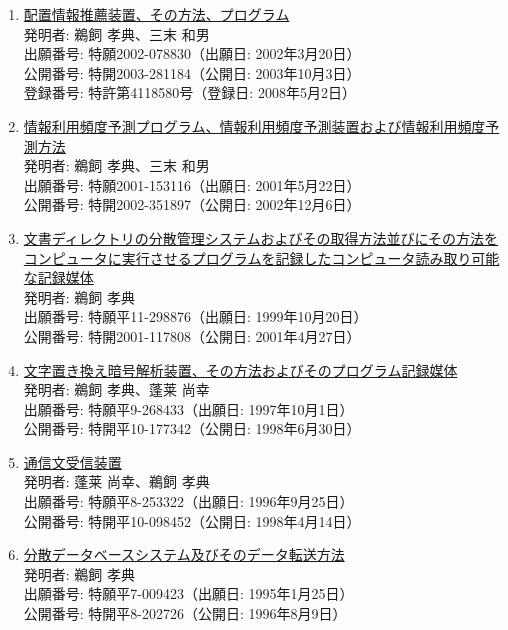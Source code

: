\documentclass[dvipdfmx]{jlreq}
\begin{document}
\begin{enumerate}[label=\arabic*,align=parleft]
\begin{enumerate}
\item \href{https://jglobal.jst.go.jp/detail?JGLOBAL_ID=201103072767260762}{配置情報推薦装置、その方法、プログラム}\\発明者: 鵜飼 孝典、三末 和男\\出願番号: 特願2002-078830（出願日: 2002年3月20日）\\公開番号: 特開2003-281184（公開日: 2003年10月3日）\\登録番号: 特許第4118580号（登録日: 2008年5月2日）
\item \href{https://jglobal.jst.go.jp/detail?JGLOBAL_ID=200903042053791042}{情報利用頻度予測プログラム、情報利用頻度予測装置および情報利用頻度予測方法}\\発明者: 鵜飼 孝典、三末 和男\\出願番号: 特願2001-153116（出願日: 2001年5月22日）\\公開番号: 特開2002-351897（公開日: 2002年12月6日）
\item \href{https://jglobal.jst.go.jp/detail?JGLOBAL_ID=200903020716053101}{文書ディレクトリの分散管理システムおよびその取得方法並びにその方法をコンピュータに実行させるプログラムを記録したコンピュータ読み取り可能な記録媒体}\\発明者: 鵜飼 孝典\\出願番号: 特願平11-298876（出願日: 1999年10月20日）\\公開番号: 特開2001-117808（公開日: 2001年4月27日）
\item \href{https://jglobal.jst.go.jp/detail?JGLOBAL_ID=200903010229519949}{文字置き換え暗号解析装置、その方法およびそのプログラム記録媒体}\\発明者: 鵜飼 孝典、蓬莱 尚幸\\出願番号: 特願平9-268433（出願日: 1997年10月1日）\\公開番号: 特開平10-177342（公開日: 1998年6月30日）
\item \href{https://jglobal.jst.go.jp/detail?JGLOBAL_ID=200903056240744288}{通信文受信装置}\\発明者: 蓬莱 尚幸、鵜飼 孝典\\出願番号: 特願平8-253322（出願日: 1996年9月25日）\\公開番号: 特開平10-098452（公開日: 1998年4月14日）
\item \href{https://jglobal.jst.go.jp/detail?JGLOBAL_ID=200903029171020399}{分散データベースシステム及びそのデータ転送方法}\\発明者: 鵜飼 孝典\\出願番号: 特願平7-009423（出願日: 1995年1月25日）\\公開番号: 特開平8-202726（公開日: 1996年8月9日）

\end{enumerate}
\end{enumerate}
\end{document}
